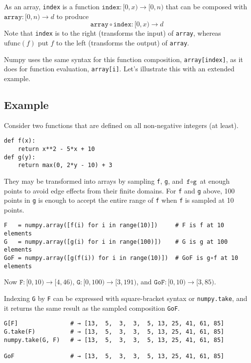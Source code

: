 \documentclass[12pt]{article}
\begin{document}
As an array, \texttt{index} is a function $\texttt{index}: [0, x) \to [0, n)$ that can be composed with $\texttt{array}: [0, n) \to d$ to produce
\[ \texttt{array} \circ \texttt{index}: [0, x) \to d \]
\noindent Note that \texttt{index} is to the right (transforms the input) of \texttt{array}, whereas $\mbox{ufunc}(f)$ put $f$ to the left (transforms the output) of \texttt{array}.

Numpy uses the same syntax for this function composition, \texttt{array[index]}, as it does for function evaluation, \texttt{array[i]}. Let's illustrate this with an extended example.

\subsection*{Example}

Consider two functions that are defined on all non-negative integers (at least).
\begin{verbatim}
def f(x):
    return x**2 - 5*x + 10
def g(y):
    return max(0, 2*y - 10) + 3
\end{verbatim}

They may be transformed into arrays by sampling \texttt{f}, \texttt{g}, and $\texttt{f} \circ \texttt{g}$ at enough points to avoid edge effects from their finite domains. For \texttt{f} and \texttt{g} above, 100 points in \texttt{g} is enough to accept the entire range of \texttt{f} when \texttt{f} is sampled at 10 points.
\begin{verbatim}
F   = numpy.array([f(i) for i in range(10)])     # F is f at 10 elements
G   = numpy.array([g(i) for i in range(100)])    # G is g at 100 elements
GoF = numpy.array([g(f(i)) for i in range(10)])  # GoF is g∘f at 10 elements
\end{verbatim}
\noindent Now $\texttt{F}: [0, 10) \to [4, 46)$, $\texttt{G}: [0, 100) \to [3, 191)$, and $\texttt{GoF}: [0, 10) \to [3, 85)$.

Indexing \texttt{G} by \texttt{F} can be expressed with square-bracket syntax or \texttt{numpy.take}, and it returns the same result as the sampled composition \texttt{GoF}.
\begin{verbatim}
G[F]               # → [13,  5,  3,  3,  5, 13, 25, 41, 61, 85]
G.take(F)          # → [13,  5,  3,  3,  5, 13, 25, 41, 61, 85]
numpy.take(G, F)   # → [13,  5,  3,  3,  5, 13, 25, 41, 61, 85]

GoF                # → [13,  5,  3,  3,  5, 13, 25, 41, 61, 85]
\end{verbatim}
\end{document}

